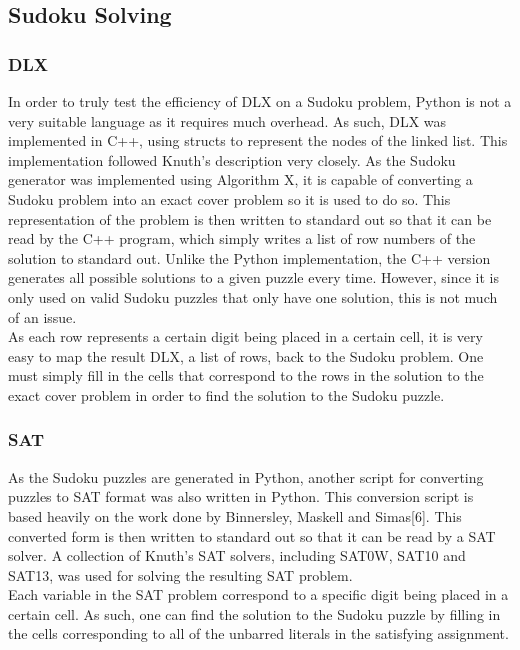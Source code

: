 \documentclass[12pt]{article}
\newcounter{row}
\newcounter{col}
\begin{document}
\subsection{Sudoku Solving}
\subsubsection{DLX}
In order to truly test the efficiency of DLX on a Sudoku problem, Python is not a very suitable language as it requires much overhead. As such, DLX was implemented in C++, using structs to represent the nodes of the linked list. This implementation followed Knuth's description very closely. As the Sudoku generator was implemented using Algorithm X, it is capable of converting a Sudoku problem into an exact cover problem so it is used to do so. This representation of the problem is then written to standard out so that it can be read by the C++ program, which simply writes a list of row numbers of the solution to standard out. Unlike the Python implementation, the C++ version generates all possible solutions to a given puzzle every time. However, since it is only used on valid Sudoku puzzles that only have one solution, this is not much of an issue. \\

As each row represents a certain digit being placed in a certain cell, it is very easy to map the result DLX, a list of rows, back to the Sudoku problem. One must simply fill in the cells that correspond to the rows in the solution to the exact cover problem in order to find the solution to the Sudoku puzzle.

\subsubsection{SAT}
As the Sudoku puzzles are generated in Python, another script for converting puzzles to SAT format was also written in Python. This conversion script is based heavily on the work done by Binnersley, Maskell and Simas[6]. This converted form is then written to standard out so that it can be read by a SAT solver. A collection of Knuth's SAT solvers, including SAT0W, SAT10 and SAT13, was used for solving the resulting SAT problem. \\

Each variable in the SAT problem correspond to a specific digit being placed in a certain cell. As such, one can find the solution to the Sudoku puzzle by filling in the cells corresponding to all of the unbarred literals in the satisfying assignment.
\end{document}
